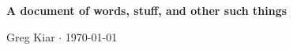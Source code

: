 \documentclass[12pt]{article}
\begin{document}
\begin{center}
\Large \bf A document of words, stuff, and other such things \end{center}
\begin{center} Greg Kiar $\cdot$  \today \end{center}
\bigskip



\end{document}
